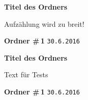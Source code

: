 \documentclass[12pt]{scrartcl}
\begin{document}
\begin{center}
  \large \textbf{Titel des Ordners}

  \vspace{\fill}
    
	Aufzählung wird zu breit!

  \vspace{\fill}

  \textbf{Ordner \#\,1}
  \texttt{30.6.2016}
\end{center}

\newpage

\begin{center}
  \large \textbf{Titel des Ordners}

  \vspace{\fill}
  
  Text für Tests

  \vspace{\fill}

  \textbf{Ordner \#\,1}
  \texttt{30.6.2016}
\end{center}

\end{document}
